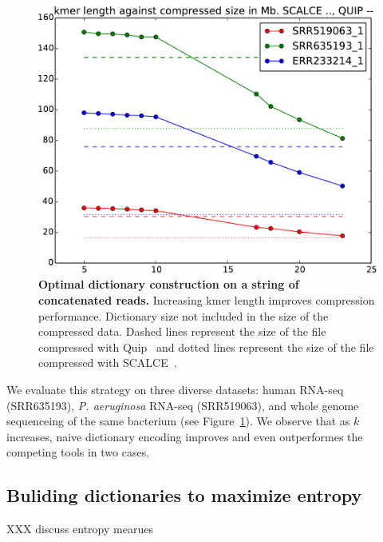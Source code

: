 \documentclass[12pt]{cmuthesis}
\begin{document}
  \begin{figure}[ht]
    \centering
    \includegraphics[width=0.7\linewidth]{figures/vary-k-fullfile-singleline}
    \caption{\textbf{Optimal dictionary construction on a string of concatenated reads.} Increasing kmer length improves compression performance. Dictionary size not included in the size of the compressed data. Dashed lines represent the size of the file compressed with Quip~\cite{Jones2012} and dotted lines represent the size of the file compressed with SCALCE~\cite{Sahinalp2012}.}
    \label{fig:denovocompr:varyK}
  \end{figure}

  We evaluate this strategy on three diverse datasets: human RNA-seq (SRR635193), \textit{P. aeruginosa} RNA-seq (SRR519063), and whole genome sequenceing of the same bacterium (see Figure~\ref{fig:denovocompr:varyK}). We observe that as $k$ increases, naive dictionary encoding improves and even outperformes the competing tools in two cases.


  \subsection{Buliding dictionaries to maximize entropy}

  XXX discuss entropy mearues
\end{document}
